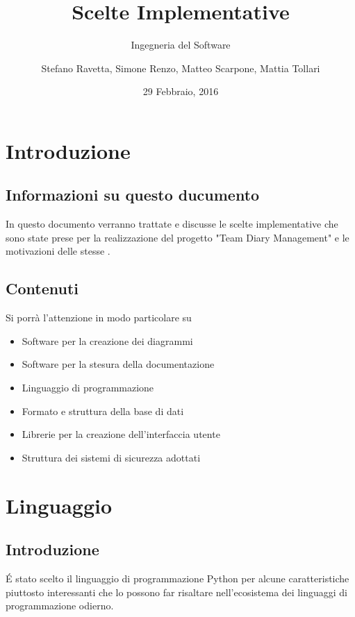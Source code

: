 \documentclass[12pt]{scrartcl}
\title{Scelte Implementative}
\subtitle{Ingegneria del Software}
\author{Stefano Ravetta, Simone Renzo, Matteo Scarpone, Mattia Tollari}
\date{29 Febbraio, 2016}
\begin{document}
\maketitle


\section{Introduzione}	%

\subsection{Informazioni su questo ducumento}
In questo documento verranno trattate e discusse le scelte
implementative che sono state prese per la realizzazione del progetto "Team Diary Management"
e le motivazioni delle stesse .

\subsection{Contenuti}
Si porr\`a l'attenzione in modo particolare su
\begin{itemize}
    \item Software per la creazione dei diagrammi
    \item Software per la stesura della documentazione
    \item Linguaggio di programmazione
    \item Formato e struttura della base di dati
    \item Librerie per la creazione dell'interfaccia utente
    \item Struttura dei sistemi di sicurezza adottati
\end{itemize}

\section{Linguaggio}
\subsection{Introduzione}
\'E stato scelto il linguaggio di programmazione Python per alcune caratteristiche
piuttosto interessanti che lo possono far risaltare nell'ecosistema dei linguaggi di programmazione odierno.
\end{document}
